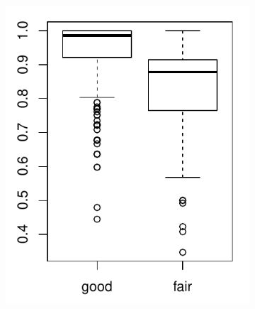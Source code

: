 \begin{figure}
\begin{subfigure}{.45\textwidth}
\includegraphics[width=\linewidth]{../simulation/plots/ARI_vs_init_case2}
\caption{}
\label{fig: ARI boxplot, case 2}
\end{subfigure}
\begin{subfigure}{.45\textwidth}

\end{subfigure}
\end{figure}
